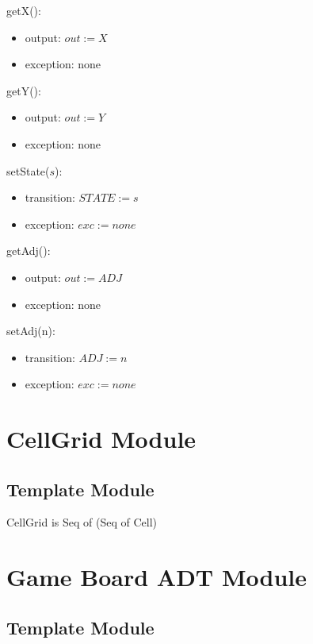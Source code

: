 \documentclass[12pt]{article}
\begin{document}
\noindent getX():
\begin{itemize}
\item output: $out := X$
\item exception: none
\end{itemize}

\noindent getY():
\begin{itemize}
\item output: $out := Y$
\item exception: none
\end{itemize}

\noindent setState($\mathit{s}$):
\begin{itemize}
\item transition: $STATE := s$
\item exception: $exc := none$
\end{itemize}

\noindent getAdj():
\begin{itemize}
\item output: $\mathit{out} := ADJ$

\item exception: none

\end{itemize}

\noindent setAdj(n):
\begin{itemize}
\item transition: $\mathit{ADJ} := n$

\item exception: $exc := none$

\end{itemize}

\newpage

\section* {CellGrid Module}

\subsection* {Template Module}

CellGrid is Seq of (Seq of Cell)

\newpage

\section* {Game Board ADT Module}

\subsection*{Template Module}
\end{document}

